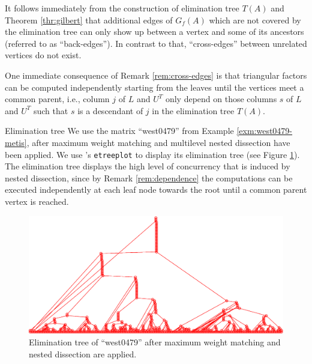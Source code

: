 \begin{remark}\label{rem:cross-edges}
It follows immediately from the construction of elimination tree $T(A)$ and Theorem
\ref{thr:gilbert}
that additional edges of $G_f(A)$ which are not covered by the elimination
tree can only show up between a vertex and some of its ancestors (referred to as ``back-edges''). In contrast to that, ``cross-edges'' between unrelated vertices
do not exist.
\end{remark}

\begin{remark}\label{rem:dependence}
One immediate consequence of Remark \ref{rem:cross-edges} is
that triangular factors can be computed independently starting from the
leaves until the vertices meet a common parent, i.e.,
column $j$ of $L$ and $U^T$ only depend on those columns $s$
of $L$ and $U^T$ such that $s$ is a descendant
of $j$ in the elimination tree $T(A)$.
\end{remark}

\begin{example}{Elimination tree}\label{exm:etree}
We use the matrix ``west0479'' from Example \ref{exm:west0479-metis},
after maximum weight matching and multilevel nested dissection have
been applied. We use \ml's \linebreak \texttt{etreeplot} to display its elimination
tree (see Figure \ref{fig:etreeplot}). The elimination tree displays the high
level of concurrency that is induced by nested dissection, since 
by Remark \ref{rem:dependence} the computations can be executed independently
at each leaf node towards the root until a common parent vertex is reached.
\end{example}
\begin{figure}
 \centering
{
\begin{minipage}{.99\textwidth}
\includegraphics[width=\textwidth,height=0.3\textwidth]{figures/west0479-match-metis-etree}
\end{minipage}
}
\caption{Elimination tree of ``west0479'' after maximum weight matching and nested dissection are applied.}\label{fig:etreeplot}
\end{figure}





